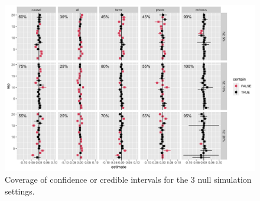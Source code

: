 \documentclass[11pt]{article}
\begin{document}
\begin{figure}[!ht]
  \centering
  \includegraphics[width=\textwidth]{figs/nullplot.png}
  \caption{Coverage of confidence or credible intervals for the 3 null
    simulation settings.}
\end{figure}
\end{document}
